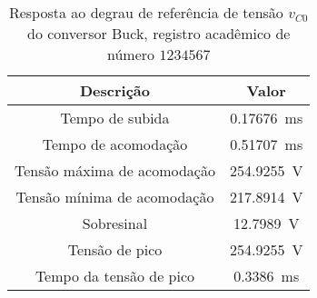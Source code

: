 \begin{table}[!ht]
\centering
\caption{Resposta ao degrau de referência de tensão $v_{C0}$ do conversor Buck, registro acadêmico de número $1234567$}
\label{tab:parametros}
\begin{tabular}{@{}cc@{}}
\toprule
\textbf{Descrição} & \textbf{Valor}\\ \midrule
Tempo de subida & \SI{0.17676}{\milli\s}\\
Tempo de acomodação & \SI{0.51707}{\milli\s}\\
Tensão máxima de acomodação & \SI{254.9255}{\V}\\
Tensão mínima de acomodação & \SI{217.8914}{\V}\\
Sobresinal & \SI{12.7989}{\V}\\
Tensão de pico & \SI{254.9255}{\V}\\
Tempo da tensão de pico & \SI{0.3386}{\milli\s}\\
\bottomrule
\end{tabular}
\end{table}

